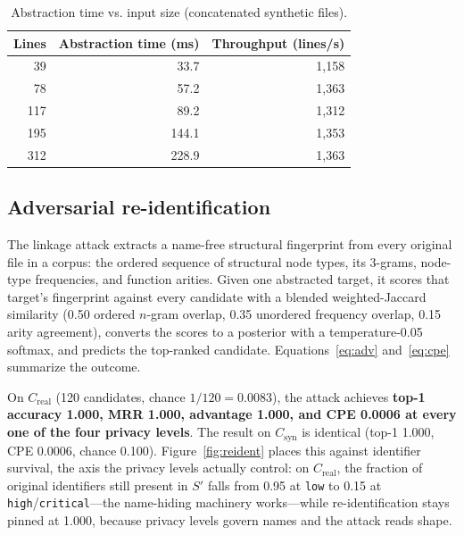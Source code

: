 \documentclass[conference]{IEEEtran}
\begin{document}
\begin{table}[!t]
\caption{Abstraction time vs. input size (concatenated synthetic files).}
\label{tab:scaling}
\centering
\renewcommand{\arraystretch}{1.1}
\begin{tabular}{@{}rrr@{}}
\toprule
\textbf{Lines} & \textbf{Abstraction time (ms)} & \textbf{Throughput (lines/s)} \\
\midrule
39  & 33.7  & 1{,}158 \\
78  & 57.2  & 1{,}363 \\
117 & 89.2  & 1{,}312 \\
195 & 144.1 & 1{,}353 \\
312 & 228.9 & 1{,}363 \\
\bottomrule
\end{tabular}
\end{table}

\subsection{Adversarial re-identification}
\label{sec:reident}

The linkage attack extracts a name-free structural fingerprint from every
original file in a corpus: the ordered sequence of structural node types,
its 3-grams, node-type frequencies, and function arities. Given one
abstracted target, it scores that target's fingerprint against every
candidate with a blended weighted-Jaccard similarity (0.50 ordered
$n$-gram overlap, 0.35 unordered frequency overlap, 0.15 arity
agreement), converts the scores to a posterior with a temperature-0.05
softmax, and predicts the top-ranked candidate. Equations~\eqref{eq:adv}
and~\eqref{eq:cpe} summarize the outcome.

On $C_{\text{real}}$ (120 candidates, chance $1/120 = 0.0083$), the
attack achieves \textbf{top-1 accuracy 1.000, MRR 1.000, advantage
1.000, and CPE 0.0006 at every one of the four privacy levels}. The result
on $C_{\text{syn}}$ is identical (top-1 1.000, CPE 0.0006, chance 0.100).
Figure~\ref{fig:reident} places this against identifier survival, the
axis the privacy levels actually control: on $C_{\text{real}}$, the
fraction of original identifiers still present in $S'$ falls from 0.95 at
\texttt{low} to 0.15 at \texttt{high}/\texttt{critical}---the
name-hiding machinery works---while re-identification stays pinned at
1.000, because privacy levels govern names and the attack reads shape.
\end{document}
